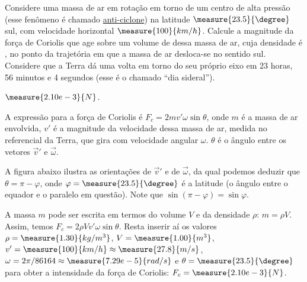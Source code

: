 \begin{question}
    Considere uma massa de ar em rotação em torno de um centro de alta pressão (esse fenômeno é chamado \href{https://en.wikipedia.org/wiki/Anticyclone}{anti-ciclone}) na latitude $\measure{23.5}{\degree}$ sul, com velocidade horizontal $\measure{100}{km/h}$.
    Calcule a magnitude da força de Coriolis que age sobre um volume de  dessa massa de ar, cuja densidade é , no ponto da trajetória em que a massa de ar desloca-se no sentido sul.
    Considere que a Terra dá uma volta em torno do seu próprio eixo em 23 horas, 56 minutos e 4 segundos (esse é o chamado ``dia sideral'').
    
    \begin{answer}
      $\measure{2.10e-3}{N}$.
    \end{answer}

    \begin{solution}
      A expressão para a força de Coriolis é $F_c = 2mv'\omega \sin\theta$, onde $m$ é a massa de ar envolvida, $v'$ é a magnitude da velocidade dessa massa de ar, medida no referencial da Terra, que gira com velocidade angular $\omega$.
      $\theta$ é o ângulo entre os vetores $\vec v'$ e $\vec\omega$.

      A figura abaixo ilustra as orientações de $\vec v'$ e de $\vec\omega$, da qual podemos deduzir que $\theta = \pi - \varphi$, onde $\varphi = \measure{23.5}{\degree}$ é a latitude (o ângulo entre o equador e o paralelo em questão).
      Note que $\sin(\pi - \varphi) = \sin\varphi$.


      A massa $m$ pode ser escrita em termos do volume $V$ e da densidade $\rho$: $m = \rho V$.
      Assim, temos $F_c = 2\rho V v'\omega \sin\theta$.
      Resta inserir aí os valores $\rho = \measure{1.30}{kg/m^3}$, $V = \measure{1.00}{m^3}$, $v' = \measure{100}{km/h} \approx \measure{27.8}{m/s}$, $\omega = 2\pi/86164 \approx \measure{7.29e-5}{rad/s}$ e $\theta = \measure{23.5}{\degree}$ para obter a intensidade da força de Coriolis: $F_c = \measure{2.10e-3}{N}$.
    \end{solution}
\end{question}